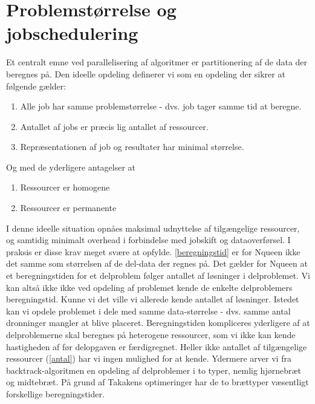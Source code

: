 \documentclass[draft,a4paper,10pt]{article}
\begin{document}
\section{Problemstørrelse og jobschedulering}
Et centralt emne ved parallelisering af algoritmer er partitionering af de data der beregnes på. Den ideelle opdeling definerer vi som en opdeling der sikrer at følgende gælder:
\begin{enumerate}
	\item Alle job har samme problemstørrelse - dvs. job tager samme tid at beregne.\label{beregningstid}
	\item Antallet af jobs er præcis lig antallet af ressourcer.\label{antal}
	\item Repræsentationen af job og resultater har minimal størrelse.\label{jobbeskrivelse}
\end{enumerate} 
Og med de yderligere antagelser at
\begin{enumerate}
	\item Ressourcer er homogene
	\item Ressourcer er permanente
\end{enumerate}
I denne ideelle situation opnåes maksimal udnyttelse af tilgængelige ressourcer, og samtidig minimalt overhead i forbindelse med jobskift og dataoverførsel.
I praksis er disse krav meget svære at opfylde. \ref{beregningstid} er for Nqueen ikke det samme som størrelsen af de del-data der regnes på. Det gælder for Nqueen at et beregningstiden for et delproblem følger antallet af løsninger i delproblemet. Vi kan altså ikke ikke ved opdeling af problemet kende de enkelte delproblemers beregningstid. Kunne vi det ville vi allerede kende antallet af løsninger. Istedet kan vi opdele problemet i dele med samme data-størrelse - dvs. samme antal dronninger mangler at blive placeret.   Beregningstiden kompliceres yderligere af at delproblemerne skal beregnes på heterogene ressourcer, som vi ikke kan kende hastigheden af før delopgaven er færdigregnet. Heller ikke antallet af tilgængelige ressourcer (\ref{antal}) har vi ingen mulighed for at kende. Ydermere arver vi fra backtrack-algoritmen en opdeling af delproblemer i to typer, nemlig hjørnebræt og midtebræt. På grund af Takakens optimeringer  har de to brættyper væsentligt forskellige beregningstider. 
\end{document}
